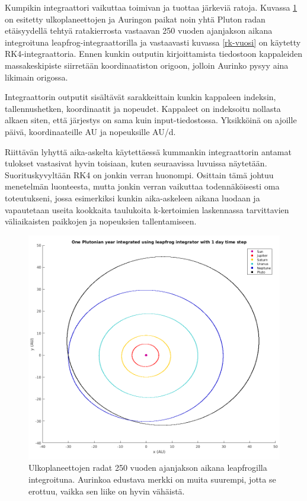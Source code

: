 \documentclass[12pt,a4paper,titlepage]{article}
\begin{document}
Kumpikin integraattori vaikuttaa toimivan ja tuottaa järkeviä ratoja. Kuvassa \ref{lf-vuosi} on esitetty ulkoplaneettojen ja Auringon paikat noin yhtä Pluton radan etäisyydellä tehtyä ratakierrosta vastaavan 250 vuoden ajanjakson aikana integroituna leapfrog-integraattorilla ja vastaavasti kuvassa \ref{rk-vuosi} on käytetty RK4-integraattoria. Ennen kunkin outputin kirjoittamista tiedostoon kappaleiden massakeskipiste siirretään koordinaatiston origoon, jolloin Aurinko pysyy aina likimain origossa.

Integraattorin outputit sisältävät sarakkeittain kunkin kappaleen indeksin, tallennushetken, koordinaatit ja nopeudet. Kappaleet on indeksoitu nollasta alkaen siten, että järjestys on sama kuin input-tiedostossa. Yksikköinä on ajoille päivä, koordinaateille AU ja nopeuksille AU/d.

Riittävän lyhyttä aika-askelta käytettäessä kummankin integraattorin antamat tulokset vastasivat hyvin toisiaan, kuten seuraavissa luvuissa näytetään. Suorituskyvyltään RK4 on jonkin verran huonompi. Osittain tämä johtuu menetelmän luonteesta, mutta jonkin verran vaikuttaa todennäköisesti oma toteutukseni, jossa esimerkiksi kunkin aika-askeleen aikana luodaan ja vapautetaan useita kookkaita taulukoita k-kertoimien laskennassa tarvittavien väliaikaisten paikkojen ja nopeuksien tallentamiseen.

\begin{figure}
\centering
\includegraphics[width=\textwidth]{../plots/vuosi-leapfrog-cut.png}
\caption{Ulkoplaneettojen radat 250 vuoden ajanjakson aikana leapfrogilla integroituna. Aurinkoa edustava merkki on muita suurempi, jotta se erottuu, vaikka sen liike on hyvin vähäistä.}
\label{lf-vuosi}
\end{figure}
\end{document}
